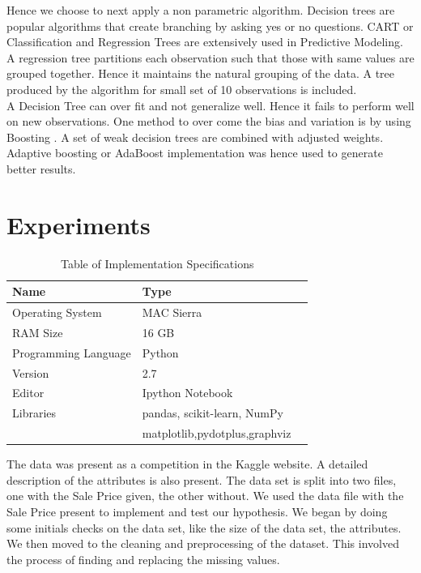 \documentclass[fleqn,10pt]{SelfArx} %
\begin{document}
	Hence we choose to next apply a non parametric algorithm. Decision trees are popular algorithms that create branching by asking yes or no questions. CART or Classification and Regression Trees are extensively used in Predictive Modeling. A regression tree partitions each observation such that those with same values are grouped together. Hence it maintains the natural grouping of the data. A tree produced by the algorithm for small set of 10 observations is included. \\
	
	A Decision Tree can over fit and not generalize well. Hence it fails to perform well on new observations. One method to over come the bias and variation is by using Boosting \cite{dt}. A set of weak decision trees are combined with adjusted weights\cite{ada}. Adaptive boosting or AdaBoost implementation was hence used to generate better results. 
	
	
	\section{Experiments}
	 \begin{table}[hbt]
	 	\caption{Table of Implementation Specifications}
	 	\centering
	 	\begin{tabular}{llr}
	 		\cmidrule(r){1-2}
	 		Name &  Type \\
	 		\midrule
	 		Operating System & MAC Sierra \\
	 		RAM Size & 16 GB\\
	 		Programming Language & Python \\
	 		Version & 2.7\\
	 		Editor & Ipython Notebook \\
	 		Libraries & pandas, scikit-learn, NumPy\\
	 		& matplotlib,pydotplus,graphviz 
	 	\end{tabular}
	 	\label{tab:label}
	 \end{table}
	 The data was present as a competition in the Kaggle website\cite{kaggle}. A detailed description of the attributes is also present. The data set is split into two files, one with the Sale Price given, the other without. We used the data file with the Sale Price present to implement and test our hypothesis. We began by doing some initials checks on the data set, like the size of the data set, the attributes. We then moved to the cleaning and preprocessing of the dataset. This involved the process of finding and replacing the missing values. \\
	 
\end{document}
